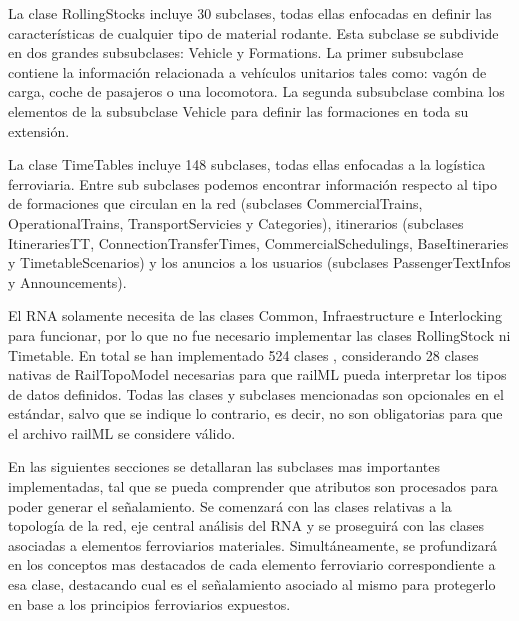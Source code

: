     La clase RollingStocks incluye 30 subclases, todas ellas enfocadas en definir las características de cualquier tipo de material rodante. Esta subclase se subdivide en dos grandes subsubclases: Vehicle y Formations. La primer subsubclase contiene la información relacionada a vehículos unitarios tales como: vagón de carga, coche de pasajeros o una locomotora. La segunda subsubclase combina los elementos de la subsubclase Vehicle para definir las formaciones en toda su extensión.
    
    La clase TimeTables incluye 148 subclases, todas ellas enfocadas a la logística ferroviaria. Entre sub subclases podemos encontrar información respecto al tipo de formaciones que circulan en la red (subclases CommercialTrains, OperationalTrains, TransportServicies y Categories), itinerarios (subclases ItinerariesTT, ConnectionTransferTimes, CommercialSchedulings, BaseItineraries y TimetableScenarios) y los anuncios a los usuarios (subclases PassengerTextInfos y Announcements).   
    
    El RNA solamente necesita de las clases Common, Infraestructure e Interlocking para funcionar, por lo que no fue necesario implementar las clases RollingStock ni Timetable. En total se han implementado 524 clases \cite{GITHUB}, considerando 28 clases nativas de RailTopoModel necesarias para que railML pueda interpretar los tipos de datos definidos. Todas las clases y subclases mencionadas son opcionales en el estándar, salvo que se indique lo contrario, es decir, no son obligatorias para que el archivo railML se considere válido.

    En las siguientes secciones se detallaran las subclases mas importantes implementadas, tal que se pueda comprender que atributos son procesados para poder generar el señalamiento. Se comenzará con las clases relativas a la topología de la red, eje central análisis del RNA y se proseguirá con las clases asociadas a elementos ferroviarios materiales. Simultáneamente, se profundizará en los conceptos mas destacados de cada elemento ferroviario correspondiente a esa clase, destacando cual es el señalamiento asociado al mismo para protegerlo en base a los principios ferroviarios expuestos.

    
    

    
    
    
    
    
    
    
    
    
    
    
